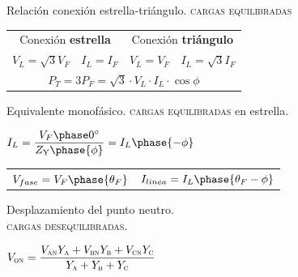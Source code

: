 \documentclass[11pt,a4paper,twocolumn]{article}
\begin{document}
\begin{cajita}
	Relación conexión estrella-triángulo. \textsc{cargas equilibradas}
	\begin{center}
		\vspace{-.5cm}
		\begin{tabular}{l l || l l}
			\multicolumn{2}{c}{Conexión \textbf{estrella}} & \multicolumn{2}{c}{\vspace{.2cm}Conexión \textbf{triángulo}} \\ \vspace{.2cm}
			$V_L = \sqrt{3} V_F$ & $I_L = I_F$ & $V_L = V_F$ & $I_L = \sqrt{3} I_F$ \\ 
			\multicolumn{4}{c}{\vspace{.2cm} $P_T = 3 P_F = \sqrt{3} \cdot V_L \cdot I_L \cdot \cos \phi$}
		\end{tabular}
	\end{center}

	\vspace{.3cm}
	
	Equivalente monofásico. \textsc{cargas equilibradas} en estrella.
	
	
	\begin{center}
		$ I_L = \dfrac{V_F \phase 0^\circ}{Z_\textsc{Y}\phase {\phi}} = I_L \phase{-\phi}$
	\end{center}
	
	\begin{center}
		\begin{tabular}{l l}
			$V_{fase} = V_F \phase {\theta_{F}} $ & $ I_{linea} = I_L \phase{\theta_{F} - \phi} $ \\
		\end{tabular}
	\end{center}
	
	\vspace{.3cm}
	
	Desplazamiento del punto neutro. \\
	\textsc{cargas desequilibradas.}
	\begin{center}
		$V_\textsc{on} = \dfrac{ V_\textsc{an}  Y_\textsc{a}  + V_\textsc{bn}  Y_\textsc{b} + V_\textsc{cn}  Y_\textsc{c} }{ Y_\textsc{a}  +Y_\textsc{b}   + Y_\textsc{c} }$
	\end{center}
	
\end{cajita}
	
\end{document}
